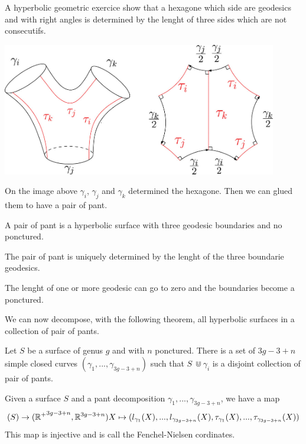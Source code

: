 A hyperbolic geometric exercice show that a hexagone which side are geodesics and with right angles is determined by the lenght of three sides which are not consecutifs.

\begin{center}
\includegraphics[width=12cm]{Image/PairOfPant.jpg}
\end{center}

 On the image above $\gamma_i$, $\gamma_j$ and $\gamma_k$ determined the hexagone. Then we can glued them to have a pair of pant.

 \begin{dfnt}
 A pair of pant is a hyperbolic surface with three geodesic boundaries and no ponctured.
 \end{dfnt}

\begin{rmq}
The pair of pant is uniquely determined by the lenght of the three boundarie geodesics.
\end{rmq}

\begin{rmq}
The lenght of one or more geodesic can go to zero and the boundaries become a ponctured.
\end{rmq}

We can now decompose, with the following theorem, all hyperbolic surfaces in a collection of pair of pants.

\begin{thm}
Let $S$ be a surface of genus $g$ and with $n$ ponctured. There is a set of $3g-3+n$ simple closed curves $(\gamma_1,...,\gamma_{3g-3+n})$ such that $S\ \Cup \gamma_i$ is a disjoint collection of pair of pants.
\end{thm}

\begin{dfnt}
Given a surface $S$ and a pant decomposition $\gamma_1,...,\gamma_{3g-3+n}$, we have a map \[
\mathcal(S) \rightarrow (\mathbb{R^{+}}^{3g-3+n},\mathbb{R}^{3g-3+n}) \\
X \mapsto (l_{\gamma_1}(X),...,l_{\gamma_{3g-3+n}}(X),\tau_{\gamma_1}(X),...,\tau_{\gamma_{3g-3+n}}(X))
\]
This map is injective and is call the Fenchel-Nielsen cordinates.
\end{dfnt}

